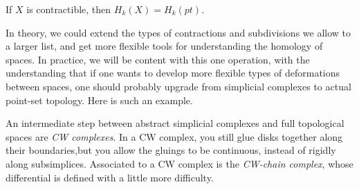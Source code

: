 \begin{corollary}
If $X$ is contractible, then $H_k(X)=H_k(pt)$. 
\end{corollary}
In theory, we could extend the types of contractions and subdivisions we allow to a larger list, and get more flexible tools for understanding the homology of spaces. In practice, we will be content with this one operation, with the understanding that if one wants to develop more flexible types of deformations between spaces, one should probably upgrade from simplicial complexes to actual point-set topology. Here is such an example. \\

{}
An intermediate step between abstract simplicial complexes and full topological spaces are \emph{CW complexes}. In a CW complex, you still glue disks together along their boundaries,\project but you allow the gluings to be continuous, instead of rigidly along subsimplices. Associated to a CW complex is the \emph{CW-chain complex}, whose differential is defined with a little more difficulty.

\label{sec:simplicialmaps}

		